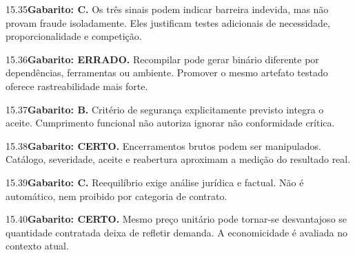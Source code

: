 \begin{solucao}{15.35}\textbf{Gabarito: C.} Os três sinais podem indicar barreira indevida, mas não provam fraude isoladamente. Eles justificam testes adicionais de necessidade, proporcionalidade e competição.\end{solucao}
\begin{solucao}{15.36}\textbf{Gabarito: ERRADO.} Recompilar pode gerar binário diferente por dependências, ferramentas ou ambiente. Promover o mesmo artefato testado oferece rastreabilidade mais forte.\end{solucao}
\begin{solucao}{15.37}\textbf{Gabarito: B.} Critério de segurança explicitamente previsto integra o aceite. Cumprimento funcional não autoriza ignorar não conformidade crítica.\end{solucao}
\begin{solucao}{15.38}\textbf{Gabarito: CERTO.} Encerramentos brutos podem ser manipulados. Catálogo, severidade, aceite e reabertura aproximam a medição do resultado real.\end{solucao}
\begin{solucao}{15.39}\textbf{Gabarito: C.} Reequilíbrio exige análise jurídica e factual. Não é automático, nem proibido por categoria de contrato.\end{solucao}
\begin{solucao}{15.40}\textbf{Gabarito: CERTO.} Mesmo preço unitário pode tornar-se desvantajoso se quantidade contratada deixa de refletir demanda. A economicidade é avaliada no contexto atual.\end{solucao}

